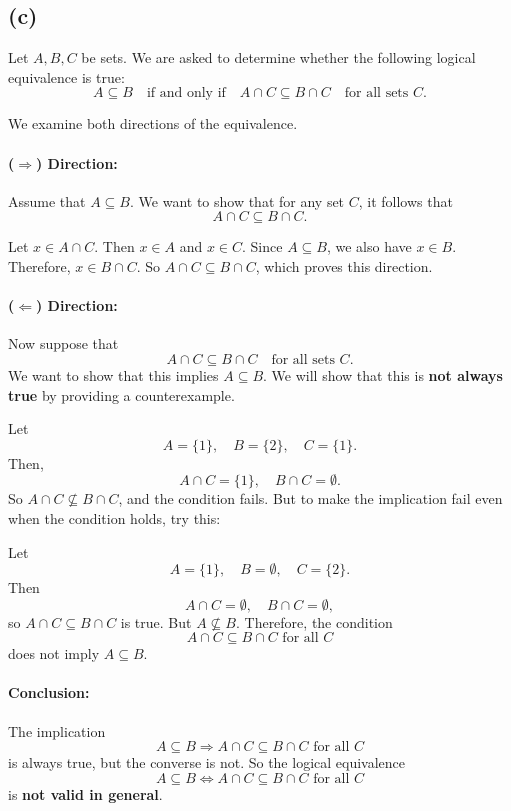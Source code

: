 \documentclass{article}
\begin{document}
\subsection*{(c)}

Let \( A, B, C \) be sets. We are asked to determine whether the following logical equivalence is true:
\[
A \subseteq B \quad \text{if and only if} \quad A \cap C \subseteq B \cap C \quad \text{for all sets } C.
\]

We examine both directions of the equivalence.

\paragraph{(\( \Rightarrow \)) Direction:} Assume that \( A \subseteq B \). We want to show that for any set \( C \), it follows that
\[
A \cap C \subseteq B \cap C.
\]

Let \( x \in A \cap C \). Then \( x \in A \) and \( x \in C \). Since \( A \subseteq B \), we also have \( x \in B \). Therefore, \( x \in B \cap C \).  
So \( A \cap C \subseteq B \cap C \), which proves this direction.

\paragraph{(\( \Leftarrow \)) Direction:} Now suppose that
\[
A \cap C \subseteq B \cap C \quad \text{for all sets } C.
\]
We want to show that this implies \( A \subseteq B \).  
We will show that this is \textbf{not always true} by providing a counterexample.

Let
\[
A = \{1\}, \quad B = \{2\}, \quad C = \{1\}.
\]
Then,
\[
A \cap C = \{1\}, \quad B \cap C = \emptyset.
\]
So \( A \cap C \nsubseteq B \cap C \), and the condition fails.  
But to make the implication fail even when the condition holds, try this:

Let
\[
A = \{1\}, \quad B = \emptyset, \quad C = \{2\}.
\]
Then
\[
A \cap C = \emptyset, \quad B \cap C = \emptyset,
\]
so \( A \cap C \subseteq B \cap C \) is true. But \( A \not\subseteq B \).  
Therefore, the condition
\[
A \cap C \subseteq B \cap C \text{ for all } C
\]
does not imply \( A \subseteq B \).

\paragraph{Conclusion:}  
The implication
\[
A \subseteq B \Rightarrow A \cap C \subseteq B \cap C \text{ for all } C
\]
is always true, but the converse is not.  
So the logical equivalence
\[
A \subseteq B \iff A \cap C \subseteq B \cap C \text{ for all } C
\]
is \textbf{not valid in general}.
\end{document}
